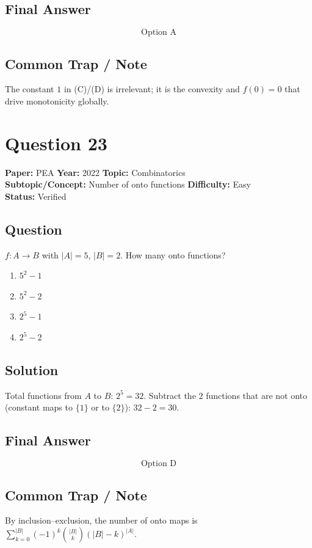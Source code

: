 \documentclass[11pt]{article}
\begin{document}
\subsection*{Final Answer}
\[
\boxed{\text{Option A}}
\]

\subsection*{Common Trap / Note}
The constant $1$ in (C)/(D) is irrelevant; it is the convexity and $f(0)=0$ that drive monotonicity globally.

\section*{Question 23}
\textbf{Paper:} PEA \quad \textbf{Year:} 2022 \quad \textbf{Topic:} Combinatorics \\
\textbf{Subtopic/Concept:} Number of onto functions \quad \textbf{Difficulty:} Easy \\
\textbf{Status:} Verified

\subsection*{Question}
$f : A \to B$ with $|A|=5$, $|B|=2$. How many onto functions?
\begin{enumerate}[label=(\Alph*)]
\item $5^2 - 1$
\item $5^2 - 2$
\item $2^5 - 1$
\item $2^5 - 2$
\end{enumerate}

\subsection*{Solution}
Total functions from $A$ to $B$: $2^5 = 32$. Subtract the $2$ functions that are not onto
(constant maps to $\{1\}$ or to $\{2\}$): $32 - 2 = 30$.

\subsection*{Final Answer}
\[
\boxed{\text{Option D}}
\]

\subsection*{Common Trap / Note}
By inclusion--exclusion, the number of onto maps is $\sum_{k=0}^{|B|}(-1)^k \binom{|B|}{k}(|B|-k)^{|A|}$.
\end{document}
